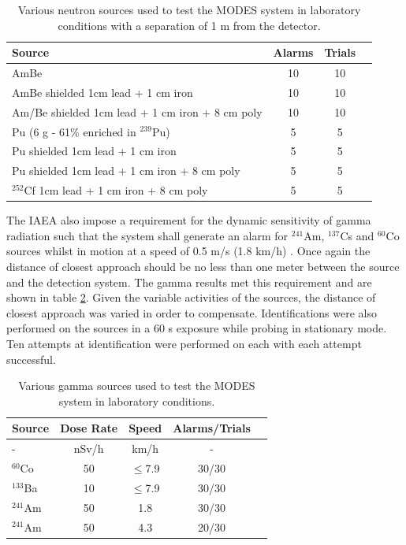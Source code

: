 \begin{table}[!htbp]
\begin{center}
	\begin{tabular}{l*{2}{c}r}
	\hline
	 \hline
	 Source & Alarms & Trials \\
    	\hline
    	AmBe 						 			& 10 & 10 \\
    	AmBe shielded 1cm lead + 1 cm iron 			& 10 & 10 \\
	Am/Be shielded 1cm lead + 1 cm iron + 8 cm poly 	& 10 & 10 \\
	Pu (6 g - 61\% enriched in $^{239}$Pu)			& 5 & 5  \\
	Pu shielded 1cm lead + 1 cm iron				& 5 & 5  \\
	Pu shielded 1cm lead + 1 cm iron + 8 cm poly		& 5 & 5 \\
	$^{252}$Cf 1cm lead + 1 cm iron + 8 cm poly		& 5 & 5 \\
    	\hline
    	\hline
  	\end{tabular}
	\caption{Various neutron sources used to test the MODES system in laboratory conditions with a separation of 1 m from the detector.}
    	\label{tab:IspraNeutronResults}
\end{center}
\end{table}

The IAEA also impose a requirement for the dynamic sensitivity of gamma radiation such that the system shall generate an alarm for $^{241}$Am, $^{137}$Cs and $^{60}$Co sources whilst in motion at a speed of 0.5 m/s (1.8 km/h) \cite{modesIAEABorder}. Once again the distance of closest approach should be no less than one meter between the source and the detection system. The gamma results met this requirement and are shown in table \ref{tab:IspraGammaResults}. Given the variable activities of the sources, the distance of closest approach was varied in order to compensate. Identifications were also performed on the sources in a 60 s exposure while probing in stationary mode. Ten attempts at identification were performed on each with each attempt successful.

\begin{table}[!htbp]
\begin{center}
	\begin{tabular}{l*{3}{c}r}
	\hline
	 \hline
	 Source & Dose Rate & Speed & Alarms/Trials \\
    	\hline
   	- & nSv/h & km/h & - \\
    	\hline
    	$^{60}$Co	 & 50 & $\leq$7.9 & 30/30 \\
    	$^{133}$Ba & 10 &$\leq$7.9 & 30/30 \\
    	$^{241}$Am & 50 & 1.8 & 30/30 \\
    	$^{241}$Am & 50 & 4.3 & 20/30 \\
    	\hline
    	\hline
  	\end{tabular}
	\caption{Various gamma sources used to test the MODES system in laboratory conditions.}
    	\label{tab:IspraGammaResults}
\end{center}
\end{table}

